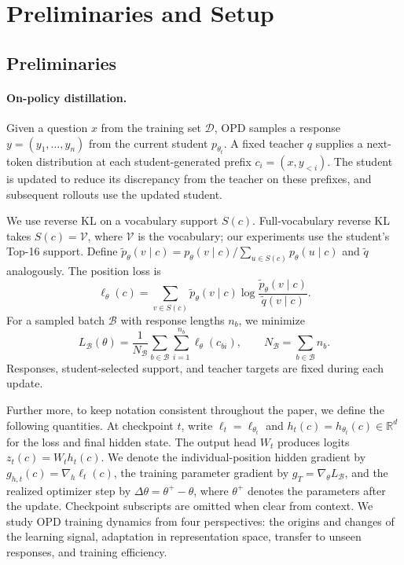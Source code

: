 \section{Preliminaries and Setup}
\label{sec:preliminaries and setup}
\subsection{Preliminaries}
\paragraph{On-policy distillation.}
Given a question $x$ from the training set $\mathcal D$, OPD samples a response $y=(y_1,\ldots,y_n)$ from the current student $p_{\theta_t}$. A fixed teacher $q$ supplies a next-token distribution at each student-generated prefix $c_i=(x,y_{<i})$. The student is updated to reduce its discrepancy from the teacher on these prefixes, and subsequent rollouts use the updated student.

We use reverse KL on a vocabulary support $S(c)$. Full-vocabulary reverse KL takes $S(c)=\mathcal V$, where $\mathcal V$ is the vocabulary; our experiments use the student's Top-16 support. Define $\tilde p_\theta(v\mid c)=p_\theta(v\mid c)/\sum_{u\in S(c)}p_\theta(u\mid c)$ and $\tilde q$ analogously. The position loss is
\begin{equation}
\ell_\theta(c)=\sum_{v\in S(c)}\tilde p_\theta(v\mid c)
\log\frac{\tilde p_\theta(v\mid c)}{\tilde q(v\mid c)}.
\label{eq:loss}
\end{equation}
For a sampled batch $\mathcal B$ with response lengths $n_b$, we minimize
\begin{equation}
L_{\mathcal B}(\theta)=\frac1{N_{\mathcal B}}\sum_{b\in\mathcal B}\sum_{i=1}^{n_b}\ell_\theta(c_{bi}),
\qquad N_{\mathcal B}=\sum_{b\in\mathcal B}n_b.
\label{eq:training_loss}
\end{equation}
Responses, student-selected support, and teacher targets are fixed during each update.

Further more, to keep notation consistent throughout the paper, we define the following quantities. At checkpoint $t$, write $\ell_t=\ell_{\theta_t}$ and $h_t(c)=h_{\theta_t}(c)\in\mathbb R^d$ for the loss and final hidden state. The output head $W_t$ produces logits $z_t(c)=W_t h_t(c)$. We denote the individual-position hidden gradient by $g_{h,t}(c)=\nabla_h\ell_t(c)$, the training parameter gradient by $g_T=\nabla_\theta L_{\mathcal B}$, and the realized optimizer step by $\Delta\theta=\theta^+-\theta$, where $\theta^+$ denotes the parameters after the update. Checkpoint subscripts are omitted when clear from context. We study OPD training dynamics from four perspectives: the origins and changes of the learning signal, adaptation in representation space, transfer to unseen responses, and training efficiency.

